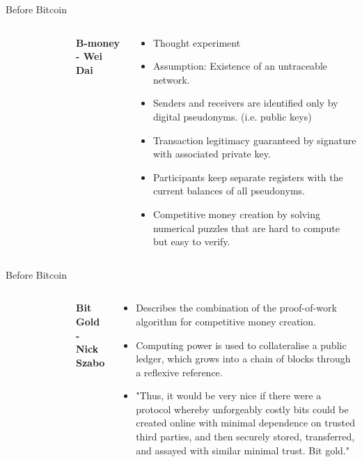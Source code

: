 \documentclass[]{beamer}
\begin{document}
\begin{frame}{Before Bitcoin}
\begin{columns}
\begin{figure}
	\begin{tikzpicture}[scale=1]
			
	\end{tikzpicture}
\end{figure}
	\textbf{B-money - Wei Dai} \\
	\vspace{0.5em}
	\begin{small}
	\begin{itemize}
		\item Thought experiment
		\item Assumption: Existence of an untraceable network.
		\item Senders and receivers are identified only by digital pseudonyms. (i.e. public keys) 
		\item Transaction legitimacy guaranteed by signature with associated private key.
		\item Participants keep separate registers with the current balances of all pseudonyms.
		\item Competitive money creation by solving numerical puzzles that are hard to compute but easy to verify.
	\end{itemize}
	\end{small}
\end{columns}
\end{frame}


\begin{frame}{Before Bitcoin}
\begin{columns}
\begin{figure}
	\begin{tikzpicture}[scale=1]
			
	\end{tikzpicture}
\end{figure}
	\textbf{Bit Gold - Nick Szabo}
	\vspace{0.5em}
	\begin{small}
	\begin{itemize}
		\item Describes the combination of the proof-of-work algorithm for competitive money creation.
		\item Computing power is used to collateralise a public ledger, which grows into a chain of blocks through a reflexive reference.
		\item "Thus, it would be very nice if there were a protocol whereby unforgeably costly bits could be created online with minimal dependence on trusted third parties, and then securely stored, transferred, and assayed with similar minimal trust. Bit gold."
	\end{itemize}
	\end{small}
\end{columns}
\end{frame}
\end{document}
